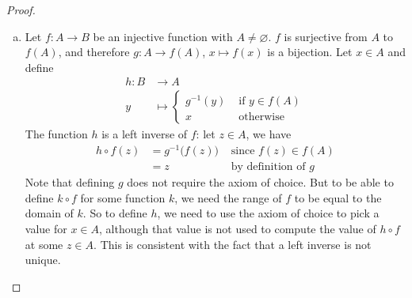 \documentclass[11pt,a4paper,twoside]{article}
\theoremstyle{definition}
\begin{document}
\begin{proof}
\begin{enumerate}[(a)]
  \item Let $f : A \to B$ be an injective function with $A \neq \varnothing$.
    $f$ is surjective from $A$ to $f (A)$, and therefore $g : A \to f (A)$, $x \mapsto f (x)$ is a bijection.
    Let $x \in A$ and define
    \begin{align*}
      h : B &\to A \\
      y &\mapsto \begin{cases}
        g^{-1} (y) &\text{ if } y \in f ( A ) \\
        x &\text{ otherwise }
      \end{cases}
    \end{align*}
    The function $h$ is a left inverse of $f$: let $z \in A$, we have
    \begin{align*}
      h \circ f ( z ) &= g^{-1} \big( f ( z ) \big) &\text{ since } f ( z ) \in f ( A ) \\
      &= z &\text{ by definition of } g
    \end{align*}
    Note that defining $g$ does not require the axiom of choice. But to be able to define $k \circ f$ for some function $k$,
    we need the range of $f$ to be equal to the domain of $k$. So to define $h$, we need to use the axiom of choice to pick a value for $x \in A$,
    although that value is not used to compute the value of $h \circ f$ at some $z \in A$. This is consistent with the fact that a left inverse is not unique.

  \end{enumerate}

\end{proof}
\end{document}
